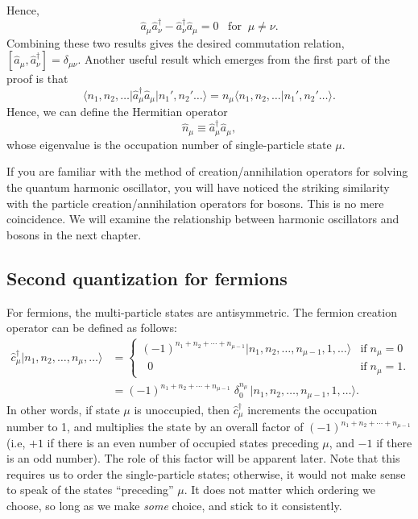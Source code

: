 \documentclass[pra,12pt]{revtex4}
\begin{document}
Hence,
$$\hat{a}_\mu \hat{a}_\nu^\dagger - \hat{a}_\nu^\dagger \hat{a}_\mu = 0 \;\;\;\mathrm{for}\;\;\mu\ne\nu.$$
Combining these two results gives the desired commutation relation,
$[\hat{a}_\mu, \hat{a}_\nu^\dagger] = \delta_{\mu\nu}$.  Another useful result which
emerges from the first part of the proof is that
$$\big\langle n_1, n_2, \dots \big| \hat{a}_\mu^\dagger \hat{a}_\mu \big| n_1', n_2'\dots\big\rangle = n_\mu \big\langle n_1, n_2, \dots \big| n_1', n_2'\dots\big\rangle.$$
Hence, we can define the Hermitian operator
$$\hat{n}_\mu \equiv \hat{a}_\mu^\dagger \hat{a}_\mu,$$
whose eigenvalue is the occupation number of single-particle state $\mu$.

If you are familiar with the method of creation/annihilation operators
for solving the quantum harmonic oscillator, you will have noticed the
striking similarity with the particle creation/annihilation operators
for bosons.  This is no mere coincidence.  We will examine the
relationship between harmonic oscillators and bosons in the next
chapter.

\subsection{Second quantization for fermions}
\label{sec:second_quantized_fermions}

For fermions, the multi-particle states are antisymmetric.  The
fermion creation operator can be defined as follows:
$$\begin{aligned}\hat{c}_\mu^\dagger |n_1, n_2, \dots, n_\mu,\dots\rangle &= \begin{cases}(-1)^{n_1 + n_2 + \cdots + n_{\mu-1}} |n_1, n_2, \dots, n_{\mu-1}, 1, \dots\rangle & \mathrm{if} \; n_\mu = 0 \\ \;\;0 & \mathrm{if}\; n_\mu = 1.
\end{cases} \\&= (-1)^{n_1 + n_2 + \cdots + n_{\mu-1}}\; \delta^{n_\mu}_0\, \big|n_1, n_2, \dots, n_{\mu-1}, 1, \dots\big\rangle. \end{aligned}$$
In other words, if state $\mu$ is unoccupied, then
$\hat{c}_\mu^\dagger$ increments the occupation number to 1, and
multiplies the state by an overall factor of $(-1)^{n_1 + n_2 + \cdots
  + n_{\mu-1}}$ (i.e, $+1$ if there is an even number of occupied
states preceding $\mu$, and $-1$ if there is an odd number).  The role
of this factor will be apparent later.  Note that this requires us to
order the single-particle states; otherwise, it would not make sense
to speak of the states ``preceding'' $\mu$.  It does not matter which
ordering we choose, so long as we make \textit{some} choice, and stick
to it consistently.
\end{document}
